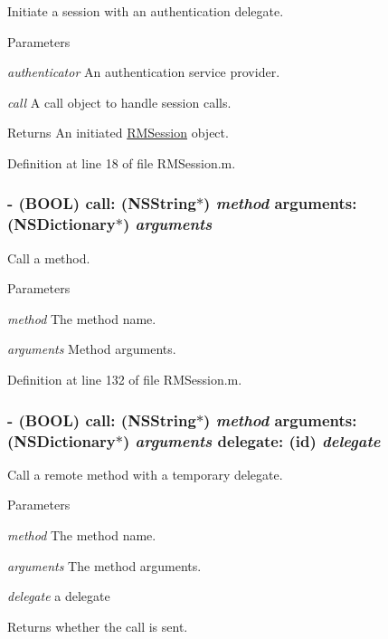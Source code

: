 Initiate a session with an authentication delegate. 
\begin{DoxyParams}{Parameters}
\item[{\em authenticator}]An authentication service provider. \item[{\em call}]A call object to handle session calls.\end{DoxyParams}
\begin{DoxyReturn}{Returns}
An initiated \hyperlink{interface_r_m_session}{RMSession} object. 
\end{DoxyReturn}


Definition at line 18 of file RMSession.m.\hypertarget{interface_r_m_session_ad8842825e7ffa3ea841d0f44dc0360ac}{
\subsubsection[{call:arguments:}]{\setlength{\rightskip}{0pt plus 5cm}-\/ (BOOL) call: (NSString$\ast$) {\em method}\/ arguments: (NSDictionary$\ast$) {\em arguments}}}
\label{interface_r_m_session_ad8842825e7ffa3ea841d0f44dc0360ac}


Call a method. 
\begin{DoxyParams}{Parameters}
\item[{\em method}]The method name. \item[{\em arguments}]Method arguments. \end{DoxyParams}


Definition at line 132 of file RMSession.m.\hypertarget{interface_r_m_session_adaf01c561e55c091d8011dc507a1f1d0}{
\subsubsection[{call:arguments:delegate:}]{\setlength{\rightskip}{0pt plus 5cm}-\/ (BOOL) call: (NSString$\ast$) {\em method}\/ arguments: (NSDictionary$\ast$) {\em arguments}\/ delegate: (id) {\em delegate}}}
\label{interface_r_m_session_adaf01c561e55c091d8011dc507a1f1d0}


Call a remote method with a temporary delegate. 
\begin{DoxyParams}{Parameters}
\item[{\em method}]The method name. \item[{\em arguments}]The method arguments. \item[{\em delegate}]a delegate\end{DoxyParams}
\begin{DoxyReturn}{Returns}
whether the call is sent. 
\end{DoxyReturn}


